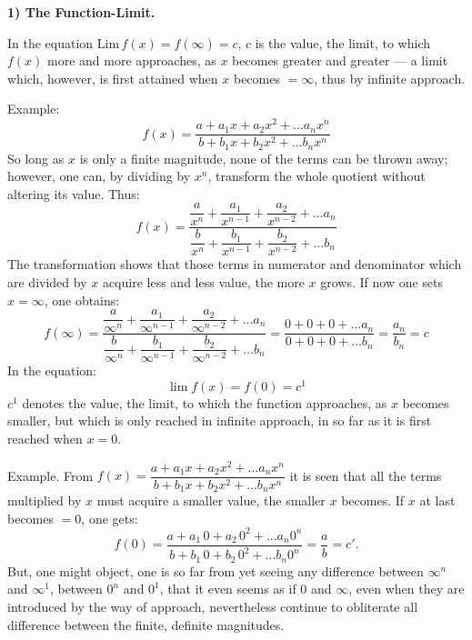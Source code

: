 \documentclass[12pt]{book}
\begin{document}
\begin{center}
\textbf{1) The Function-Limit.}
\end{center}
{}

In the equation $\mathrm{Lim}\, f(x) = f(\infty) = c$, $c$ is the value, the limit, to
which $f(x)$ more and more approaches, as $x$ becomes greater and greater --- a limit
which, however, is first attained when $x$ becomes $= \infty$, thus by infinite
approach.

Example:
\[
f(x) = \frac{a + a_1 x + a_2 x^{2} + \dots a_n x^{n}}{b + b_1 x + b_2 x^{2}
+ \dots b_n x^{n}}
\]
So long as $x$ is only a finite magnitude, none of the terms can be thrown away;
however, one can, by dividing by $x^{n}$, transform the whole quotient without
altering its value. Thus:
\[
f(x) = \frac{\dfrac{a}{x^{n}} + \dfrac{a_1}{x^{n-1}} + \dfrac{a_2}{x^{n-2}}
+ \dots a_n}{\dfrac{b}{x^{n}} + \dfrac{b_1}{x^{n-1}} + \dfrac{b_2}{x^{n-2}}
+ \dots b_n}
\]
The transformation shows that those terms in numerator and denominator which are
divided by $x$ acquire less and less value, the more $x$ grows. If now one sets
$x = \infty$, one obtains:
\[
f(\infty) = \frac{\dfrac{a}{\infty^{n}} + \dfrac{a_1}{\infty^{n-1}}
+ \dfrac{a_2}{\infty^{n-2}} + \dots a_n}{\dfrac{b}{\infty^{n}}
+ \dfrac{b_1}{\infty^{n-1}} + \dfrac{b_2}{\infty^{n-2}} + \dots b_n}
= \frac{0+0+0+\dots a_n}{0+0+0+\dots b_n} = \frac{a_n}{b_n} = c
\]
In the equation:
\[
\lim f(x) = f(0) = c^{1}
\]
$c^{1}$ denotes the value, the limit, to which the function approaches, as $x$ becomes
smaller, but which is only reached in infinite approach, in so far as it is first
reached when $x = 0$.

Example.
From $f(x) = \dfrac{a + a_1 x + a_2 x^{2} + \dots a_n x^{n}}{b + b_1 x + b_2 x^{2}
+ \dots b_n x^{n}}$ it is seen that all the terms multiplied by $x$ must acquire a
smaller value, the smaller $x$ becomes. If $x$ at last becomes $= 0$, one gets:
\[
f(0) = \frac{a + a_1\,0 + a_2\,0^{2} + \dots a_n 0^{n}}{b
+ b_1\,0 + b_2\,0^{2} + \dots b_n 0^{n}} = \frac{a}{b} = c'.
\]
But, one might object, one is so far from yet seeing any difference between
$\infty^{n}$ and $\infty^{1}$, between $0^{n}$ and $0^{1}$, that it even seems as if
$0$ and $\infty$, even when they are introduced by the way of approach, nevertheless
continue to obliterate all difference between the finite, definite magnitudes.
\end{document}
